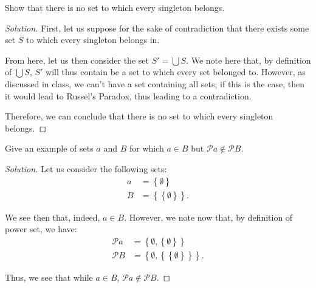 \documentclass{article}
\newenvironment{solution}{\begin{proof}[Solution]}{\end{proof}}
\newcommand{\brc}[1]{ \left\{  {#1} \right\}}
\begin{document}
	\begin{hw}[Problem 2.8]
		Show that there is no set to which every singleton belongs.
	\end{hw}
	\begin{solution}
		First, let us suppose for the sake of contradiction that there exists some set $S$ to which every singleton belongs in.
		
		From here, let us then consider the set $S' = \bigcup S$. We note here that, by definition of $\bigcup S$, $S'$ will thus contain be a set to which every set belonged to. However, as discussed in class, we can't have a set containing all sets; if this is the case, then it would lead to Russel's Paradox, thus leading to a contradiction.
		
		Therefore, we can conclude that there is no set to which every singleton belongs.
	\end{solution}

	\begin{hw}[Problem 2.9]
		Give an example of sets $a$ and $B$ for which $a \in B$ but $\mathscr{P}a \not\in \mathscr{P}B$.
	\end{hw}
	\begin{solution}
		Let us consider the following sets:
		\begin{align*}
			a &= \brc{\emptyset} \\
			B &= \brc{ \brc{\emptyset}}.
		\end{align*}
	
		We see then that, indeed, $a \in B$. However, we note now that, by definition of power set, we have:
		\begin{align*}
			\mathscr{P}a &= \brc{\emptyset, \brc{\emptyset}} \\
			\mathscr{P}B &= \brc{\emptyset, \brc{ \brc{\emptyset}}}.
		\end{align*}
	
		Thus, we see that while $a \in B$, $\mathscr{P}a \not\in \mathscr P B$.
	\end{solution}
\end{document}
